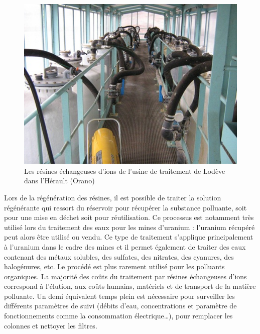 \documentclass{article}
\begin{document}
\begin{figure}[H]
\centering
\includegraphics[width=0.6\linewidth]{III_A_3.png}
\caption{Les résines échangeuses d'ions de l'usine de traitement de Lodève dans l'Hérault (Orano)}
\label{fig:usine_traitement_resines}
\end{figure}

Lors de la régénération des résines, il est possible de traiter la solution régénérante qui ressort du réservoir pour récupérer la substance polluante, soit pour une mise en déchet soit pour réutilisation. Ce processus est notamment très utilisé lors du traitement des eaux pour les mines d’uranium : l’uranium récupéré peut alors être utilisé ou vendu.
Ce type de traitement s’applique principalement à l’uranium dans le cadre des mines et il permet également de traiter des eaux contenant des métaux solubles, des sulfates, des nitrates, des cyanures, des halogénures, etc. Le procédé est plus rarement utilisé pour les polluants organiques.
La majorité des coûts du traitement par résines échangeuses d’ions correspond à l’élution, aux coûts humains, matériels et de transport de la matière polluante. Un demi équivalent temps plein est nécessaire pour surveiller les différents paramètres de suivi (débits d’eau, concentrations et paramètre de fonctionnements comme la consommation électrique…), pour remplacer les colonnes et nettoyer les filtres.


\end{document}
